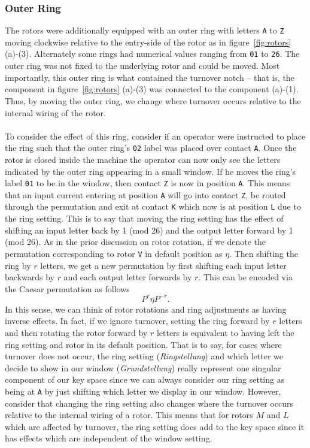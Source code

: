 \subsubsection{Outer Ring}

The rotors were additionally equipped with an outer ring with
letters \texttt{A} to \texttt{Z} moving clockwise relative to the
entry-side of the rotor as in figure~\ref{fig:rotors} (a)-(3).
Alternately some rings had numerical values
ranging from \texttt{01} to \texttt{26}. The outer ring was not fixed
to the underlying rotor and could be moved. Most importantly, this
outer ring is what contained the turnover notch -- that is, the
component in figure~\ref{fig:rotors} (a)-(3) was connected to the
component (a)-(1). Thus, by moving the outer ring, we change where
turnover occurs relative to the internal wiring of the rotor.
\\\\To consider the effect of this ring,
consider if an operator were instructed to place the ring such that
the outer ring's \texttt{02} label was placed over contact \texttt{A}. Once
the rotor is closed inside the machine
the operator can now only see the letters indicated by the outer ring
appearing in a small window. If he moves the ring's label \texttt{01}
to be in the window, then contact \texttt{Z} is now in position
\texttt{A}. This means that an input current
entering at position \texttt{A} will go into contact \texttt{Z}, be
routed through the permutation and exit
at contact \texttt{K} which now is at position \texttt{L} due to the
ring setting. This is to say that moving the ring
setting has the effect of shifting an input letter back by 1 (mod 26)
and the output letter forward by 1 (mod 26).
As in the prior discussion on rotor rotation, if we denote the
permutation corresponding to rotor \texttt{V} in default position as
$\eta$. Then shifting the ring by $r$ letters, we get a new
permutation by first shifting each input letter backwards by $r$ and
each output letter forwards by $r$. This can be encoded via the
Caesar permutation as follows
\[
  {P^{r}}\eta{P^{-r}}.
\]
In this sense, we can think of rotor rotations and ring adjustments
as having inverse effects. In fact, if we ignore turnover, setting
the ring forward by $r$ letters and then rotating the rotor forward by $r$
letters is equivalent to having left the ring setting and rotor in
its default position. That is to say, for cases where turnover does
not occur, the ring setting (\emph{Ringstellung}) and which letter
we decide to show in our window (\emph{Grundstellung}) really
represent one singular component of our key space since we can always
consider our ring setting as being at \texttt{A} by just shifting
which letter we display in our window.
However, consider that changing the ring
setting also changes where the turnover occurs relative to the
internal wiring of a rotor. This means that for rotors $M$ and $L$
which are affected by turnover, the ring setting does add to
the key space since it has effects which are independent of the
window setting.

